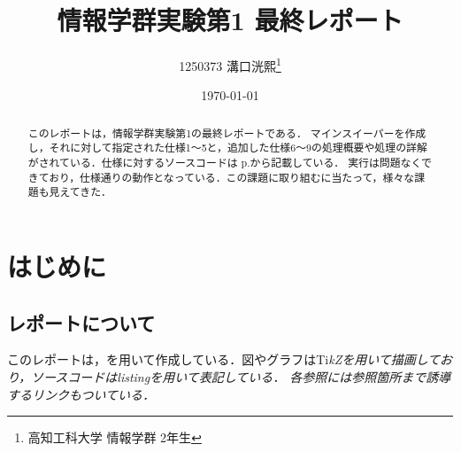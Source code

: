 \documentclass[a4j,11pt]{jsarticle}
\title{\vspace{0cm}情報学群実験第1 最終レポート}
\author{1250373 溝口洸熙\thanks{高知工科大学 情報学群 2年生}}
\date{\today}
\begin{document}
\maketitle

\begin{abstract}
    このレポートは，情報学群実験第1の最終レポートである．
    マインスイーパーを作成し，それに対して指定された仕様1〜5と，追加した仕様6〜9の処理概要や処理の詳解がされている．仕様に対するソースコードは p.\pageref{sec:ソースコード}から記載している．
    実行は問題なくできており，仕様通りの動作となっている．この課題に取り組むに当たって，様々な課題も見えてきた．
\end{abstract}
\newpage
\tableofcontents
\newpage
\section*{はじめに}
\subsection*{レポートについて}
このレポートは，\LaTeXe を用いて作成している．図やグラフはTi\it{k}\normalfont Zを用いて描画しており，ソースコードはlistingを用いて表記している．
各参照には参照箇所まで誘導するリンクもついている．
\end{document}
